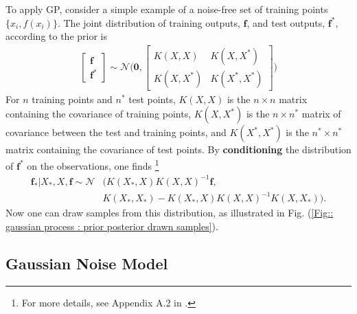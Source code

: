 \documentclass[twoside,english]{uiofysmaster}
\begin{document}
To apply GP, consider a simple example of a noise-free set of training points $\{x_i, f(x_i)\}$. The joint distribution of training outputs, $\textbf{f}$, and test outputs, $\textbf{f}^*$, according to the prior is
\begin{align}
\begin{bmatrix}
\textbf{f}\\
\textbf{f}^*
\end{bmatrix}
\sim 
\mathcal{N} \Bigg(
\boldsymbol{0},
\begin{bmatrix}
K(X, X) & K(X, X^*)\\
K(X, X^*) & K(X^*, X^*)
\end{bmatrix}
 \Bigg)
\end{align}
For $n$ training points and $n^*$ test points, $K(X,X)$ is the $n \times n$ matrix containing the covariance of training points, $K(X, X^*)$ is the $n \times n^*$ matrix of covariance between the test and training points, and $K(X^*, X^*)$ is the $n^* \times n^*$ matrix containing the covariance of test points. By \textbf{conditioning} the distribution of $\textbf{f}^*$ on the observations,  one finds \cite{rasmussen2006gaussian} \footnote{For more details, see Appendix A.2 in \cite{rasmussen2006gaussian}.}
\begin{align}
\textbf{f}_* \big| X_*, X, \textbf{f} \sim \mathcal{N}&(K(X_*, X)K(X, X)^{-1} \textbf{f},\\ &K(X_*, X_*) - K(X_*, X)K(X, X)^{-1}K(X, X_*)).
\end{align}
Now one can draw samples from this distribution, as illustrated in Fig. (\ref{Fig:: gaussian process : prior posterior drawn samples}).


\subsection{Gaussian Noise Model}
\end{document}
